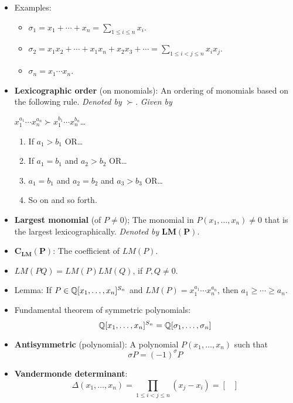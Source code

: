 \documentclass[../notes.tex]{subfiles}
\begin{document}
\begin{itemize}
    \item Examples:
    \begin{itemize}
        \item $\sigma_1=x_1+\cdots+x_n=\sum_{1\leq i\leq n}x_i$.
        \item $\sigma_2=x_1x_2+\cdots+x_1x_n+x_2x_3+\cdots=\sum_{1\leq i<j\leq n}x_ix_j$.
        \item $\sigma_n=x_1\cdots x_n$.
    \end{itemize}
    \item \textbf{Lexicographic order} (on monomials): An ordering of monomials based on the following rule. \emph{Denoted by} $\bm{\succ}$. \emph{Given by}\par
    $x_1^{a_1}\cdots x_n^{a_n}\succ x_1^{b_1}\cdots x_n^{b_n}$\dots
    \begin{enumerate}
        \item If $a_1>b_1$ OR\dots
        \item If $a_1=b_1$ and $a_2>b_2$ OR\dots
        \item $a_1=b_1$ and $a_2=b_2$ and $a_3>b_3$ OR\dots
        \item So on and so forth.
    \end{enumerate}
    \item \textbf{Largest monomial} (of $P\neq 0$); The monomial in $P(x_1,\dots,x_n)\neq 0$ that is the largest lexicographically. \emph{Denoted by} $\bm{LM(P)}$.
    \item $\bm{C_{LM}(P)}$: The coefficient of $LM(P)$.
    \item $LM(PQ)=LM(P)LM(Q)$, if $P,Q\neq 0$.
    \item Lemma: If $P\in\mathbb{Q}[x_1,\dots,x_n]^{S_n}$ and $LM(P)=x_1^{a_1}\cdots x_n^{a_n}$, then $a_1\geq\cdots\geq a_n$.
    \item Fundamental theorem of symmetric polynomials:
    \begin{equation*}
        \mathbb{Q}[x_1,\dots,x_n]^{S_n} = \mathbb{Q}[\sigma_1,\dots,\sigma_n]
    \end{equation*}
    \item \textbf{Antisymmetric} (polynomial): A polynomial $P(x_1,\dots,x_n)$ such that
    \begin{equation*}
        \sigma P=(-1)^\sigma P
    \end{equation*}
    \item \textbf{Vandermonde determinant}:
    \begin{equation*}
        \Delta(x_1,\dots,x_n) = \prod_{1\leq i<j\leq n}(x_j-x_i) =
        \begin{bmatrix}

\end{bmatrix}
\end{equation*}
\end{itemize}
\end{document}
